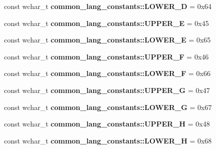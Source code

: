 \begin{DoxyCompactItemize}
\item 
\hypertarget{group___indexing_gad616778df4ee21502908226412e0a636}{const wchar\-\_\-t {\bfseries common\-\_\-lang\-\_\-constants\-::\-L\-O\-W\-E\-R\-\_\-\-D} = 0x64}\label{group___indexing_gad616778df4ee21502908226412e0a636}

\item 
\hypertarget{group___indexing_gaa649029e4fbc364abaa9416a1721377e}{const wchar\-\_\-t {\bfseries common\-\_\-lang\-\_\-constants\-::\-U\-P\-P\-E\-R\-\_\-\-E} = 0x45}\label{group___indexing_gaa649029e4fbc364abaa9416a1721377e}

\item 
\hypertarget{group___indexing_ga635f0270ed9b12f2f9b5d6667b89483e}{const wchar\-\_\-t {\bfseries common\-\_\-lang\-\_\-constants\-::\-L\-O\-W\-E\-R\-\_\-\-E} = 0x65}\label{group___indexing_ga635f0270ed9b12f2f9b5d6667b89483e}

\item 
\hypertarget{group___indexing_gaf98dde4de7c6fac85a255f7f199d37ba}{const wchar\-\_\-t {\bfseries common\-\_\-lang\-\_\-constants\-::\-U\-P\-P\-E\-R\-\_\-\-F} = 0x46}\label{group___indexing_gaf98dde4de7c6fac85a255f7f199d37ba}

\item 
\hypertarget{group___indexing_gac9be8c8eca2e1dbe32986589417fd45c}{const wchar\-\_\-t {\bfseries common\-\_\-lang\-\_\-constants\-::\-L\-O\-W\-E\-R\-\_\-\-F} = 0x66}\label{group___indexing_gac9be8c8eca2e1dbe32986589417fd45c}

\item 
\hypertarget{group___indexing_ga5278977ad01eb68c17d957cbe2fe1541}{const wchar\-\_\-t {\bfseries common\-\_\-lang\-\_\-constants\-::\-U\-P\-P\-E\-R\-\_\-\-G} = 0x47}\label{group___indexing_ga5278977ad01eb68c17d957cbe2fe1541}

\item 
\hypertarget{group___indexing_ga2c67c6160da408a20f8e8b5a44705619}{const wchar\-\_\-t {\bfseries common\-\_\-lang\-\_\-constants\-::\-L\-O\-W\-E\-R\-\_\-\-G} = 0x67}\label{group___indexing_ga2c67c6160da408a20f8e8b5a44705619}

\item 
\hypertarget{group___indexing_ga2d13c2b7cd814f1531de552126f5ba22}{const wchar\-\_\-t {\bfseries common\-\_\-lang\-\_\-constants\-::\-U\-P\-P\-E\-R\-\_\-\-H} = 0x48}\label{group___indexing_ga2d13c2b7cd814f1531de552126f5ba22}

\item 
\hypertarget{group___indexing_ga0622ef98504891ed56f58e90d23daf44}{const wchar\-\_\-t {\bfseries common\-\_\-lang\-\_\-constants\-::\-L\-O\-W\-E\-R\-\_\-\-H} = 0x68}\label{group___indexing_ga0622ef98504891ed56f58e90d23daf44}


\end{DoxyCompactItemize}
